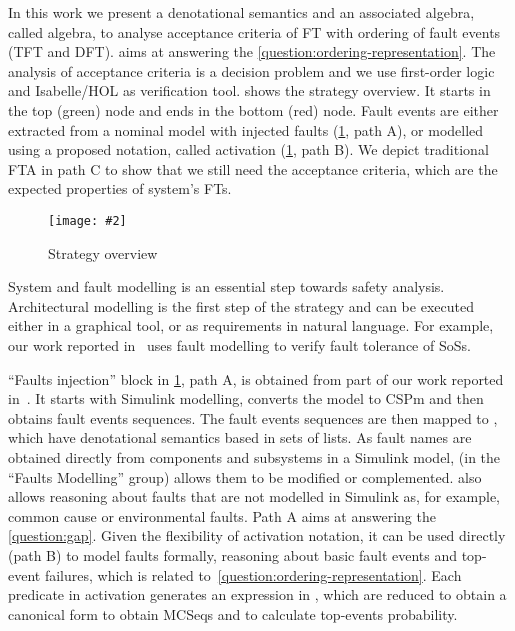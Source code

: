\documentclass[12pt,openright,twoside,a4paper,oldfontcommands,english,brazil,draft]{abntex2}
\theoremstyle{theo}
\newcommand{\includegraphicsaspectratio}[2][1]{%
  \texttt{[image: \#2]}%
}
\newcommand{\simulink}{Simulink\xspace}
\begin{document}
In this work we present a denotational semantics and an associated algebra, called \acf{algebra}, to analyse acceptance criteria of \ac{FT} with ordering of fault events (\ac{TFT} and \ac{DFT}).
 aims at answering the \ref{question:ordering-representation}.
The analysis of acceptance criteria is a decision problem and we use first-order logic and Isabelle/HOL as verification tool.
 shows the strategy overview.
It starts in the top (green) node and ends in the bottom (red) node.
Fault events are either extracted from a nominal model with injected faults (\cref{fig:strategy-overview}, path A), or modelled using a proposed notation, called \ac{activation} (\cref{fig:strategy-overview}, path B).
We depict traditional \ac{FTA} in path C to show that we still need the acceptance criteria, which are the expected properties of system's \acp{FT}.

\begin{figure}[t]
  \centering
  \includegraphicsaspectratio[0.9]{StrategyOverview}
  \caption{Strategy overview}
  \label{fig:strategy-overview}
\end{figure}

System and fault modelling is an essential step towards safety analysis.
Architectural modelling is the first step of the strategy and can be executed either in a graphical tool, or as requirements in natural language.
For example, our work reported in~\cite{APR+2013,ADP+2013} uses fault modelling to verify fault tolerance of \acp{SoS}.

``Faults injection'' block in \cref{fig:strategy-overview}, path A, is obtained from part of our work reported in~\cite{DM2012,Didier2012}.
It starts with \simulink modelling, converts the model to \ac{CSPm} and then obtains fault events sequences.
The fault events sequences are then mapped to , which have denotational semantics based in sets of lists.
As fault names are obtained directly from components and subsystems in a \simulink model,  (in the ``Faults Modelling'' group) allows them to be modified or complemented.
 also allows reasoning about faults that are not modelled in \simulink as, for example, common cause or environmental faults.
Path A aims at answering the \ref{question:gap}.
Given the flexibility of \ac{activation} notation, it can be used directly (path B) to model faults formally, reasoning about basic fault events and top-event failures, which is related to~\ref{question:ordering-representation}.
Each predicate in \ac{activation} generates an expression in , which are reduced to obtain a canonical form to obtain \acp{MCSeq} and to calculate top-events probability.
\end{document}
